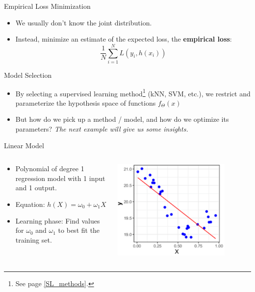 \begin{frame}{Empirical Loss Minimization}
  \begin{itemize}
    \item We usually don't know the joint distribution.
    \item Instead, minimize an estimate of the expected loss, the \textbf{empirical loss}:
      \[ \frac{1}{N} \sum_{i=1}^{N} L(y_i, h(x_i)) \]
  \end{itemize}
\end{frame}

\begin{frame}{Model Selection}
  \begin{itemize}
    \item By selecting a supervised learning method\footnote{See page \ref{SL_methods}.} (kNN, SVM, etc.), we restrict and parameterize the hypothesis space of functions $f_\Theta(x)$
    \item But how do we pick up a method / model, and how do we optimize its parameters? \textit{The next example will give us some insights.}
  \end{itemize}
\end{frame}


\begin{frame}{Linear Model}
  \begin{columns}
    \begin{column}{0.5\textwidth}
      \begin{itemize}
        \item Polynomial of degree 1 regression model with 1 input and 1 output.
        \item Equation: $h(X) = \omega_0 + \omega_1 X$ 
        \item Learning phase: Find values for $\omega_0$ and $\omega_1$ to best fit the training set. 
      \end{itemize}
    \end{column}
    \begin{column}{0.5\textwidth}
      \includegraphics[width=0.8\textwidth]{images/lm.png}
    \end{column}
  \end{columns}
\end{frame}

